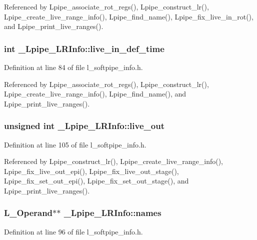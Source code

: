 Referenced by Lpipe\_\-associate\_\-rot\_\-regs(), Lpipe\_\-construct\_\-lr(), Lpipe\_\-create\_\-live\_\-range\_\-info(), Lpipe\_\-find\_\-name(), Lpipe\_\-fix\_\-live\_\-in\_\-rot(), and Lpipe\_\-print\_\-live\_\-ranges().
\subsubsection{\setlength{\rightskip}{0pt plus 5cm}int \bf{\_\-Lpipe\_\-LRInfo::live\_\-in\_\-def\_\-time}}\label{struct__Lpipe__LRInfo_9f1d5e793fecfd9d8392c8cb8f39f65f}




Definition at line 84 of file l\_\-softpipe\_\-info.h.

Referenced by Lpipe\_\-associate\_\-rot\_\-regs(), Lpipe\_\-construct\_\-lr(), Lpipe\_\-create\_\-live\_\-range\_\-info(), Lpipe\_\-find\_\-name(), and Lpipe\_\-print\_\-live\_\-ranges().
\subsubsection{\setlength{\rightskip}{0pt plus 5cm}unsigned int \bf{\_\-Lpipe\_\-LRInfo::live\_\-out}}\label{struct__Lpipe__LRInfo_594f265494d76619532559b1f3cde230}




Definition at line 105 of file l\_\-softpipe\_\-info.h.

Referenced by Lpipe\_\-construct\_\-lr(), Lpipe\_\-create\_\-live\_\-range\_\-info(), Lpipe\_\-fix\_\-live\_\-out\_\-epi(), Lpipe\_\-fix\_\-live\_\-out\_\-stage(), Lpipe\_\-fix\_\-set\_\-out\_\-epi(), Lpipe\_\-fix\_\-set\_\-out\_\-stage(), and Lpipe\_\-print\_\-live\_\-ranges().
\subsubsection{\setlength{\rightskip}{0pt plus 5cm}L\_\-Operand$\ast$$\ast$ \bf{\_\-Lpipe\_\-LRInfo::names}}\label{struct__Lpipe__LRInfo_fd23833144a3d6c82aebcaea85e678c2}




Definition at line 96 of file l\_\-softpipe\_\-info.h.

